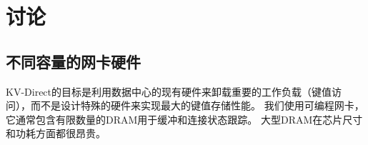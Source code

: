 \section{讨论}
\label{kvdirect:sec:discussion}

\subsection{不同容量的网卡硬件}
\label{kvdirect:sec:different-nic}

KV-Direct的目标是利用数据中心的现有硬件来卸载重要的工作负载（键值访问），而不是设计特殊的硬件来实现最大的键值存储性能。 我们使用可编程网卡，它通常包含有限数量的DRAM用于缓冲和连接状态跟踪。 大型DRAM在芯片尺寸和功耗方面都很昂贵。

\begin{table}[t]
\centering
{}
\caption{不同网卡 DRAM / PCIe吞吐率（垂直）和网卡 /主机内存大小比（水平）下长尾工作负载的最佳负载分配比。}
\label{kvdirect:tab:optimal-load-dispatch}

\end{table}

